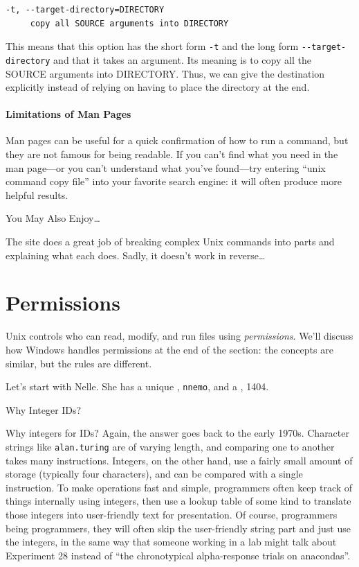 \documentclass{book}
\begin{document}
\begin{verbatim}
-t, --target-directory=DIRECTORY
     copy all SOURCE arguments into DIRECTORY
\end{verbatim}

This means that this option has the short form \texttt{-t} and the long
form \texttt{-{}-target-directory} and that it takes an argument. Its
meaning is to copy all the SOURCE arguments into DIRECTORY. Thus, we can
give the destination explicitly instead of relying on having to place
the directory at the end.

\mbox{}\paragraph{Limitations of Man Pages}

Man pages can be useful for a quick confirmation of how to run a
command, but they are not famous for being readable. If you can't find
what you need in the man page---or you can't understand what you've
found---try entering ``unix command copy file'' into your favorite
search engine: it will often produce more helpful results.

\begin{swcbox}{You May Also Enjoy\ldots{}}

The  site does a great
job of breaking complex Unix commands into parts and explaining what
each does. Sadly, it doesn't work in reverse\ldots{}

\end{swcbox}

\section{Permissions}

Unix controls who can read, modify, and run files using
\emph{permissions}. We'll discuss how Windows handles permissions at the
end of the section: the concepts are similar, but the rules are
different.

Let's start with Nelle. She has a unique , \texttt{nnemo}, and a , 1404.

\begin{swcbox}{Why Integer IDs?}

Why integers for IDs? Again, the answer goes back to the early 1970s.
Character strings like \texttt{alan.turing} are of varying length, and
comparing one to another takes many instructions. Integers, on the other
hand, use a fairly small amount of storage (typically four characters),
and can be compared with a single instruction. To make operations fast
and simple, programmers often keep track of things internally using
integers, then use a lookup table of some kind to translate those
integers into user-friendly text for presentation. Of course,
programmers being programmers, they will often skip the user-friendly
string part and just use the integers, in the same way that someone
working in a lab might talk about Experiment 28 instead of ``the
chronotypical alpha-response trials on anacondas''.

\end{swcbox}
\end{document}

